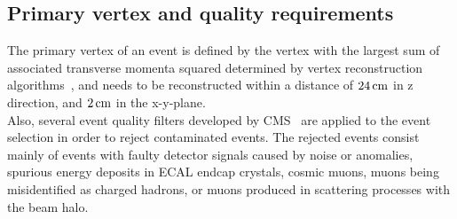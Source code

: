 
\subsection{Primary vertex and quality requirements}
The primary vertex of an event is defined by the vertex with the largest sum of associated transverse momenta squared determined by vertex reconstruction algorithms~\cite{vertex}, and needs to be reconstructed within a distance of $24\,\text{cm}$ in z direction, and $2\,\text{cm}$ in the x-y-plane.\\
Also, several event quality filters developed by CMS~\cite{MetFilter} are applied to the event selection in order to reject contaminated events.
The rejected events consist mainly of events with faulty detector signals caused by noise or anomalies, spurious energy deposits in ECAL endcap crystals, cosmic muons, muons being misidentified as charged hadrons, or muons produced in scattering processes with the beam halo.


